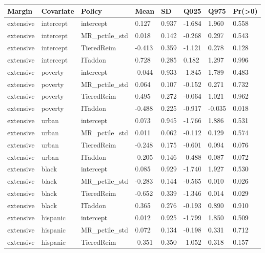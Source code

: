 \begin{table}[htbp]
\centering
\begin{tabular}{llllllll}
  \toprule
Margin & Covariate & Policy & Mean & SD & Q025 & Q975 & Pr(>0) \\ 
  \midrule
extensive & intercept & intercept & 0.127 & 0.937 & -1.684 & 1.960 & 0.558 \\ 
  extensive & intercept & MR_pctile_std & 0.018 & 0.142 & -0.268 & 0.297 & 0.543 \\ 
  extensive & intercept & TieredReim & -0.413 & 0.359 & -1.121 & 0.278 & 0.128 \\ 
  extensive & intercept & ITaddon & 0.728 & 0.285 & 0.182 & 1.297 & 0.996 \\ 
  extensive & poverty & intercept & -0.044 & 0.933 & -1.845 & 1.789 & 0.483 \\ 
  extensive & poverty & MR_pctile_std & 0.064 & 0.107 & -0.152 & 0.271 & 0.732 \\ 
  extensive & poverty & TieredReim & 0.495 & 0.272 & -0.064 & 1.021 & 0.962 \\ 
  extensive & poverty & ITaddon & -0.488 & 0.225 & -0.917 & -0.035 & 0.018 \\ 
  extensive & urban & intercept & 0.073 & 0.945 & -1.766 & 1.886 & 0.531 \\ 
  extensive & urban & MR_pctile_std & 0.011 & 0.062 & -0.112 & 0.129 & 0.574 \\ 
  extensive & urban & TieredReim & -0.248 & 0.175 & -0.601 & 0.094 & 0.076 \\ 
  extensive & urban & ITaddon & -0.205 & 0.146 & -0.488 & 0.087 & 0.072 \\ 
  extensive & black & intercept & 0.085 & 0.929 & -1.740 & 1.927 & 0.530 \\ 
  extensive & black & MR_pctile_std & -0.283 & 0.144 & -0.565 & 0.010 & 0.026 \\ 
  extensive & black & TieredReim & -0.652 & 0.339 & -1.346 & 0.014 & 0.029 \\ 
  extensive & black & ITaddon & 0.365 & 0.276 & -0.193 & 0.890 & 0.910 \\ 
  extensive & hispanic & intercept & 0.012 & 0.925 & -1.799 & 1.850 & 0.509 \\ 
  extensive & hispanic & MR_pctile_std & 0.072 & 0.134 & -0.198 & 0.331 & 0.712 \\ 
  extensive & hispanic & TieredReim & -0.351 & 0.350 & -1.052 & 0.318 & 0.157 \\ 

\end{tabular}
\end{table}
